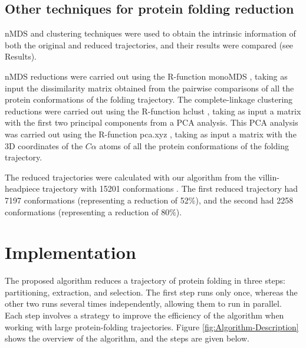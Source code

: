 \documentclass[twocolumn]{bmcart}%
\begin{document}
\subsection*{Other techniques for protein folding reduction \label{subsec:Techniques-for-reduction}}

nMDS and clustering techniques were used to obtain the intrinsic information of both the original and reduced trajectories, and their results were compared (see Results).

nMDS reductions were carried out using the R-function monoMDS \cite{Oksanen2019}, taking as input the dissimilarity matrix obtained from the pairwise comparisons of all the protein conformations of the folding trajectory. The complete-linkage clustering reductions were carried out using the R-function hclust \cite{RCoreTeam2018}, taking as input a matrix with the first two principal components from a PCA analysis. This PCA analysis was carried out using the R-function pca.xyz \cite{Grant2006}, taking as input a matrix with the 3D coordinates of the $C\alpha$ atoms of all the protein conformations of the folding trajectory.

The reduced trajectories were calculated with our algorithm from the villin-headpiece trajectory with 15201 conformations \cite{Larson2009}. The first reduced trajectory had 7197 conformations (representing a reduction of 52\%), and the second had 2258 conformations (representing a reduction of 80\%).


\section*{Implementation}

The proposed algorithm reduces a trajectory of protein folding in three steps: partitioning, extraction, and selection. The first step runs only once, whereas the other two runs several times independently, allowing them to run in parallel. Each step involves a strategy to improve the efficiency of the algorithm when working with large protein-folding trajectories. Figure \ref{fig:Algorithm-Description} shows the overview of the algorithm, and the steps are given below.
\end{document}
